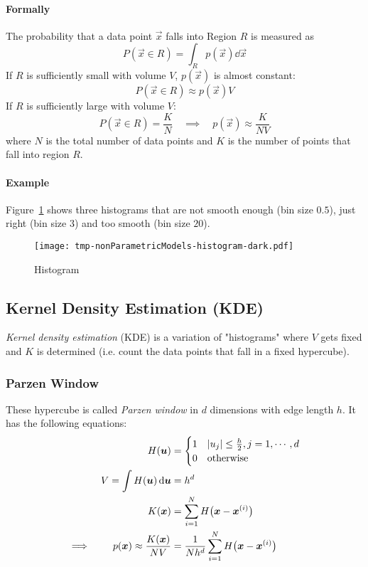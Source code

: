 			\paragraph{Formally}
				The probability that a data point \(\vec{x}\) falls into Region \(R\) is measured as
				\begin{equation}
					P(\vec{x} \in R) = \int_R p(\vec{x}) \dd{\vec{x}}
				\end{equation}
				If \(R\) is sufficiently small with volume \(V\), \(p(\vec{x})\) is almost constant:
				\begin{equation}
					P(\vec{x} \in R) \approx p(\vec{x}) V
				\end{equation}
				If \(R\) is sufficiently large with volume \(V\):
				\begin{equation}
					P(\vec{x} \in R) = \frac{K}{N} \quad\implies\quad p(\vec{x}) \approx \frac{K}{NV}
				\end{equation}
				where \(N\) is the total number of data points and \(K\) is the number of points that fall into region \(R\).

			\paragraph{Example}
				Figure~\ref{fig:histogram} shows three histograms that are not smooth enough (bin size \(0.5\)), just right (bin size \(3\)) and too smooth (bin size \(20\)).

				\begin{figure}
					\centering
					\texttt{[image: tmp-nonParametricModels-histogram-dark.pdf]}
					\caption{Histogram}
					\label{fig:histogram}
				\end{figure}

		\subsection{Kernel Density Estimation (KDE)}
			\emph{Kernel density estimation} (KDE) is a variation of "histograms" where \(V\) gets fixed and \(K\) is determined (i.e. count the data points that fall in a fixed hypercube).

			\subsubsection{Parzen Window}
				These hypercube is called \emph{Parzen window} in \(d\) dimensions with edge length \(h\). It has the following equations:
				\begin{align}
					H(\bm{u}) &=
						\begin{cases}
							1 & \abs{u_j} \leq \frac{h}{2}, j = 1, \cdots, d \\
							0 & \textrm{otherwise}
						\end{cases} \\
					V = \int H(\bm{u}) \dd{\bm{u}} &= h^d \\
					K(\bm{x}) &= \sum_{i = 1}^{N} H\big(\bm{x} - \bm{x}^{(i)}\big) \\
					\implies\qquad p(\bm{x}) \approx \frac{K(\bm{x})}{NV} &= \frac{1}{Nh^d} \sum_{i = 1}^{N} H\big(\bm{x} - \bm{x}^{(i)}\big)
				\end{align}

